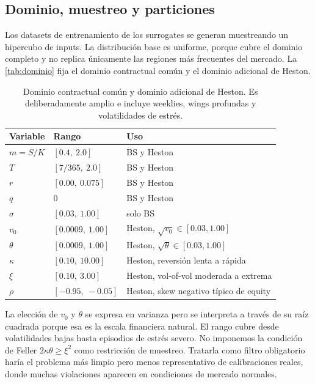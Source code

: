 \documentclass[11pt,a4paper]{article}
\begin{document}
\subsection{Dominio, muestreo y particiones}

Los datasets de entrenamiento de los surrogates se generan muestreando un hipercubo de inputs. La distribución base es uniforme, porque cubre el dominio completo y no replica únicamente las regiones más frecuentes del mercado. La \autoref{tab:dominio} fija el dominio contractual común y el dominio adicional de Heston.

\begin{table}[ht]
\centering
\small
\begin{tabular}{lll}
\toprule
Variable & Rango & Uso \\
\midrule
$m = S/K$ & $[0.4,\ 2.0]$ & BS y Heston \\
$T$ & $[7/365,\ 2.0]$ & BS y Heston \\
$r$ & $[0.00,\ 0.075]$ & BS y Heston \\
$q$ & $0$ & BS y Heston \\
$\sigma$ & $[0.03,\ 1.00]$ & solo BS \\
\midrule
$v_0$ & $[0.0009,\ 1.00]$ & Heston, $\sqrt{v_0} \in [0.03, 1.00]$ \\
$\theta$ & $[0.0009,\ 1.00]$ & Heston, $\sqrt{\theta} \in [0.03, 1.00]$ \\
$\kappa$ & $[0.10,\ 10.00]$ & Heston, reversión lenta a rápida \\
$\xi$ & $[0.10,\ 3.00]$ & Heston, vol-of-vol moderada a extrema \\
$\rho$ & $[-0.95,\ -0.05]$ & Heston, skew negativo típico de equity \\
\bottomrule
\end{tabular}
\caption{Dominio contractual común y dominio adicional de Heston. Es deliberadamente amplio e incluye weeklies, wings profundas y volatilidades de estrés.}
\label{tab:dominio}
\end{table}

La elección de $v_0$ y $\theta$ se expresa en varianza pero se interpreta a través de su raíz cuadrada porque esa es la escala financiera natural. El rango cubre desde volatilidades bajas hasta episodios de estrés severo. No imponemos la condición de Feller $2\kappa\theta \geq \xi^2$ como restricción de muestreo. Tratarla como filtro obligatorio haría el problema más limpio pero menos representativo de calibraciones reales, donde muchas violaciones aparecen en condiciones de mercado normales.
\end{document}
